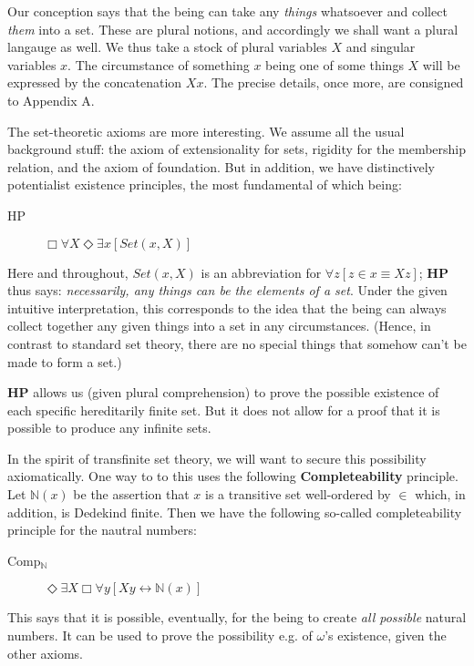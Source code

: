 \documentclass{article}
\begin{document}
Our conception says that the being can take any \emph{things} whatsoever and collect 
\emph{them} into a set. These are plural notions, and accordingly we shall want a plural 
langauge as well. We thus take a stock of plural variables $X$ and singular variables $x$.
The circumstance of something $x$ being one of some things $X$ will be expressed by 
the concatenation $Xx$. The precise details, once more,  are consigned to Appendix A. 

The set-theoretic axioms are more interesting. We assume all the usual 
background stuff: the axiom of extensionality for sets, rigidity for the 
membership relation, and the axiom of foundation. But in addition, we have 
distinctively potentialist existence principles, the most fundamental of which 
being:

\begin{description} 
    \item[HP] $\Box \forall X \Diamond \exists x [Set(x, X)]$
\end{description}
Here and throughout, $Set(x, X)$ is an abbreviation for 
$\forall z[z \in x \equiv Xz]$; {\bf HP} thus says: \emph{necessarily, any 
things can be the elements of a set}. Under the given 
intuitive interpretation, this corresponds to the idea that the being 
can always collect together any given things into a set in any circumstances.  
(Hence, in contrast to standard set theory, there are no 
special things that somehow can't be made to form a set.)

{\bf HP} allows us (given plural comprehension) to prove the possible existence 
of each specific hereditarily finite set. But it does not allow for a proof that 
it is possible to produce any infinite sets. 

In the spirit of transfinite 
set theory, we will want to secure this possibility axiomatically. 
One way to to this uses the following {\bf Completeability} principle. 
Let $\mathbb{N}(x)$ be the assertion that $x$ is a transitive set well-ordered 
by $\in$ which, in addition, is Dedekind finite. Then we have the following 
so-called completeability principle for the nautral numbers:
\begin{description}
    \item[Comp$_\mathbb{N}$]
    $\Diamond \exists X \Box \forall y[ Xy \leftrightarrow \mathbb{N}(x)]$
\end{description}
This says that it is possible, eventually, for the being to create \emph{all possible}
natural numbers. It can be used to prove the possibility 
e.g. of $\omega$'s existence, given the other axioms.
\end{document}
